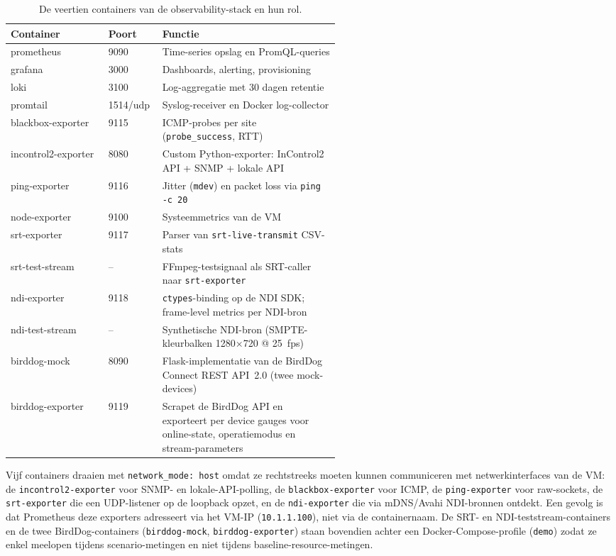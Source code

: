 \begin{table}[H]
  \centering
  \caption[Containers in de observability-stack]{De veertien containers van de observability-stack en hun rol.}
  \label{tab:containers}
  \begin{tabular}{l l p{0.54\linewidth}}
    \hline
    \textbf{Container} & \textbf{Poort} & \textbf{Functie} \\
    \hline
    prometheus            & 9090      & Time-series opslag en PromQL-queries \\
    grafana               & 3000      & Dashboards, alerting, provisioning \\
    loki                  & 3100      & Log-aggregatie met 30 dagen retentie \\
    promtail              & 1514/udp  & Syslog-receiver en Docker log-collector \\
    blackbox-exporter     & 9115      & ICMP-probes per site (\texttt{probe\_success}, RTT) \\
    incontrol2-exporter   & 8080      & Custom Python-exporter: InControl2 API + SNMP + lokale API \\
    ping-exporter         & 9116      & Jitter (\texttt{mdev}) en packet loss via \texttt{ping -c 20} \\
    node-exporter         & 9100      & Systeemmetrics van de VM \\
    srt-exporter          & 9117      & Parser van \texttt{srt-live-transmit} CSV-stats \\
    srt-test-stream       & --        & FFmpeg-testsignaal als SRT-caller naar \texttt{srt-exporter} \\
    ndi-exporter          & 9118      & \texttt{ctypes}-binding op de NDI SDK; frame-level metrics per NDI-bron \\
    ndi-test-stream       & --        & Synthetische NDI-bron (SMPTE-kleurbalken 1280$\times$720 @ 25~fps) \\
    birddog-mock          & 8090      & Flask-implementatie van de BirdDog Connect REST API~2.0 (twee mock-devices) \\
    birddog-exporter      & 9119      & Scrapet de BirdDog API en exporteert per device gauges voor online-state, operatiemodus en stream-parameters \\
    \hline
  \end{tabular}
\end{table}

Vijf containers draaien met \texttt{network\_mode: host} omdat ze rechtstreeks moeten kunnen communiceren met netwerkinterfaces van de VM: de \texttt{incontrol2-exporter} voor SNMP- en lokale-API-polling, de \texttt{blackbox-exporter} voor ICMP, de \texttt{ping-exporter} voor raw-sockets, de \texttt{srt-exporter} die een UDP-listener op de loopback opzet, en de \texttt{ndi-exporter} die via mDNS/Avahi NDI-bronnen ontdekt. Een gevolg is dat Prometheus deze exporters adresseert via het VM-IP (\texttt{10.1.1.100}), niet via de containernaam. De SRT- en NDI-teststream-containers en de twee BirdDog-containers (\texttt{birddog-mock}, \texttt{birddog-exporter}) staan bovendien achter een Docker-Compose-profile (\texttt{demo}) zodat ze enkel meelopen tijdens scenario-metingen en niet tijdens baseline-resource-metingen.

